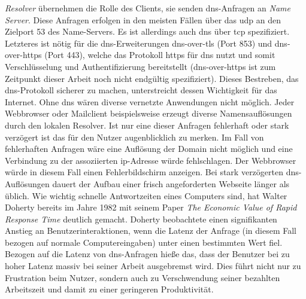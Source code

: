 \documentclass[titlepage]{report}
\begin{document}
\emph{Resolver} übernehmen die Rolle des Clients, sie senden
\gls{dns}\hyp{}Anfragen an \emph{Name Server}. Diese
Anfragen erfolgen in den meisten Fällen über das \gls{udp} an den Zielport
53 des Name\hyp{}Servers\cite[Siehe Section 4.2.1]{RFC1035}. Es ist allerdings auch \gls{dns}
über \gls{tcp} spezifiziert\cite[Siehe Section 4.2.2]{RFC1035}.
Letzteres ist nötig für die \gls{dns}\hyp{}Erweiterungen
\gls{dns}\hyp{}over\hyp{}\gls{tls} (Port 853) und
\gls{dns}\hyp{}over\hyp{}\gls{https} (Port 443), welche das Protokoll
\gls{https} für
\gls{dns} nutzt und somit Verschlüsselung und Authentifizierung bereitstellt \cite{RFC7858}
(\gls{dns}\hyp{}over\hyp{}\gls{https} ist zum Zeitpunkt dieser Arbeit
noch nicht endgültig spezifiziert). Dieses Bestreben, das
\gls{dns}\hyp{}Protokoll sicherer
zu machen, unterstreicht dessen Wichtigkeit für das Internet. Ohne
\gls{dns} wären diverse vernetzte Anwendungen nicht möglich. Jeder
Webbrowser oder Mailclient beispielsweise erzeugt diverse
Namensauflösungen durch den lokalen Resolver. Ist nur
eine dieser Anfragen fehlerhaft oder stark verzögert ist das für den
Nutzer augenblicklich zu merken. Im Fall von fehlerhaften Anfragen wäre
eine Auflösung der Domain nicht möglich und eine Verbindung zu der
assoziierten \gls{ip}\hyp{}Adresse würde fehlschlagen. Der Webbrowser
würde in diesem Fall einen Fehlerbildschirm anzeigen.
Bei stark verzögerten
\gls{dns}\hyp{}Auflösungen dauert der Aufbau einer frisch angeforderten
Webseite länger als üblich. Wie wichtig schnelle Antwortzeiten eines Computers
sind, hat Walter Doherty bereits im Jahre 1982 mit seinem Paper \emph{The
Economic Value of Rapid Response Time} deutlich gemacht. Doherty
beobachtete einen signifikanten Anstieg an Benutzerinteraktionen, wenn
die Latenz der Anfrage (in diesem Fall bezogen auf normale
Computereingaben) unter einen bestimmten Wert fiel\cite{DOHERTY}.
Bezogen auf die Latenz von \gls{dns}\hyp{}Anfragen hieße das, dass der
Benutzer bei zu hoher Latenz massiv bei seiner Arbeit ausgebremst wird. Dies führt nicht nur
zu Frustration beim Nutzer, sondern auch zu Verschwendung seiner
bezahlten Arbeitszeit und damit zu einer geringeren Produktivität.
\end{document}
